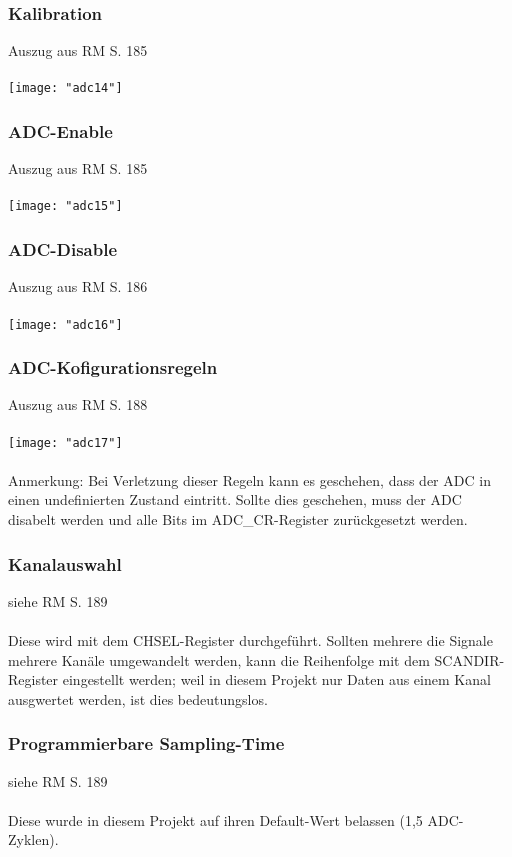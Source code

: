 \documentclass[11pt]{report}
\begin{document}
			\subsubsection{Kalibration}
				Auszug aus RM S. 185\\
				\\\texttt{[image: "adc14"]}\\
			\subsubsection{ADC-Enable}
				Auszug aus RM S. 185\\
				\\\texttt{[image: "adc15"]}\\
			\subsubsection{ADC-Disable}
				Auszug aus RM S. 186\\
				\\\texttt{[image: "adc16"]}\\
			\subsubsection{ADC-Kofigurationsregeln}
				Auszug aus RM S. 188\\
				\\\texttt{[image: "adc17"]}\\
				\\Anmerkung: Bei Verletzung dieser Regeln kann es geschehen, dass der ADC in einen undefinierten Zustand eintritt. Sollte dies geschehen, muss der ADC disabelt werden und alle Bits im ADC\_CR-Register zurückgesetzt werden.
			\subsubsection{Kanalauswahl}
				siehe RM S. 189\\
				\\Diese wird mit dem CHSEL-Register durchgeführt. Sollten mehrere die Signale mehrere Kanäle umgewandelt werden, kann die Reihenfolge mit dem SCANDIR-Register eingestellt werden; weil in diesem Projekt nur Daten aus einem Kanal ausgwertet werden, ist dies bedeutungslos.
			\subsubsection{Programmierbare Sampling-Time}
				siehe RM S. 189\\
				\\Diese wurde in diesem Projekt auf ihren Default-Wert belassen (1,5 ADC-Zyklen).
\end{document}
